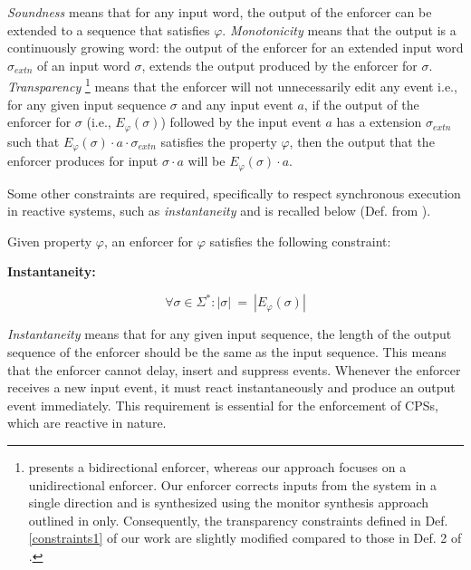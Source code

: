 \textit{Soundness} means that for any input word, the output of the enforcer can be extended to a sequence that satisfies $\varphi$. \textit{Monotonicity} means that the output is a continuously growing word: the output of the enforcer for an extended input word $\sigma_{extn}$ of an input word $\sigma$, extends the output produced by the enforcer for $\sigma$. %
\textit{Transparency} 
\footnote{\cite{1} presents a bidirectional enforcer, whereas our approach focuses on a unidirectional enforcer. Our enforcer corrects inputs from the system in a single direction and is synthesized using the monitor synthesis approach outlined in \cite{1} only. Consequently, the transparency constraints defined in Def. \ref{constraints1} of our work are slightly modified compared to those in Def. 2 of \cite{1}.} 
means that the enforcer will not unnecessarily edit any event i.e., for any given input sequence $\sigma$ and any input event $a$, if the output of the enforcer for $\sigma$ (i.e., $E_{\varphi} (\sigma)$) followed by the input event $a$ has a extension $\sigma_{extn}$ such
that $E_{\varphi} (\sigma) \cdot a \cdot \sigma_{extn}$ satisfies the property $\varphi$, then the output that the enforcer produces for input
$\sigma \cdot a$ will be $E_{\varphi} (\sigma) \cdot a$.
    

Some other constraints are required, specifically to respect synchronous execution in reactive systems, such as \textit{instantaneity} and is recalled below (Def. from \cite{}). 
\begin{definition}
    Given property $\varphi$, an enforcer for $\varphi$ satisfies the following constraint:
        \begin{flushleft}
            \textbf{Instantaneity:}
        \end{flushleft}
        \vspace{-1em}
        \begin{equation*}
            \label{eq:Ins}            
              \forall \sigma \in \Sigma^{\ast}: | \sigma | ~=~ | E_{\varphi} (\sigma )|
        \end{equation*}
        \label{constraints2}
\end{definition}

\textit{Instantaneity} means that for any given input sequence, the length of the output sequence of the enforcer should be the same as the input sequence. This means that the enforcer cannot delay, insert and suppress events. Whenever the enforcer receives a new input event, it must react instantaneously and produce an output event immediately. This requirement is essential for the enforcement of CPSs, which are reactive in nature. \\


